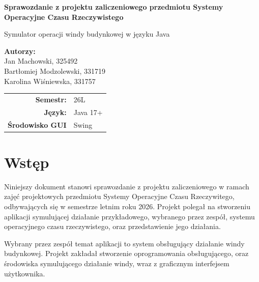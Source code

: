 \documentclass[12pt, a4paper]{article}
\begin{document}
\begin{titlepage}
  \centering
  \vspace*{2cm}
  {\LARGE\bfseries Sprawozdanie z projektu zaliczeniowego przedmiotu
  Systemy Operacyjne Czasu Rzeczywistego\par}
  \vspace{0.5cm}
  {\Large Symulator operacji windy budynkowej w języku Java\par}
  \vspace{0.3cm}
  \vspace{3cm}
    \textbf{Autorzy:} \\
  \vspace{0.3cm}
  Jan Machowski, 325492 \\
  Bartłomiej Modzolewski, 331719 \\
  Karolina Wiśniewska, 331757 \\
    \vspace{2cm}
  \begin{tabular}{rl}
    \textbf{Semestr:}             & 26L \\
    \textbf{Język:}            & Java 17+ \\
    \textbf{Środowisko GUI}     & Swing \\
  \end{tabular}
  \vfill
\end{titlepage}

\tableofcontents
\newpage


\section{Wstęp}
\label{sec:wstep}

Niniejszy dokument stanowi sprawozdanie z projektu zaliczeniowego w ramach zajęć projektowych przedmiotu Systemy Operacyjne Czasu 
Rzeczywitego, odbywających się w semestrze letnim roku 2026. Projekt polegał na stworzeniu aplikacji symulującej działanie przykładowego,
wybranego przez zespół, systemu operacyjnego czasu rzeczywistego, oraz przedstawienie jego działania.

Wybrany przez zespół temat aplikacji to system obsługujący działanie windy budynkowej. Projekt zakładał stworzenie oprogramowania
obsługującego, oraz środowiska symulującego działanie windy, wraz z graficznym interfejsem użytkownika.
\end{document}
